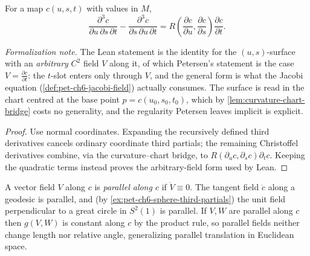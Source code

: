 \begin{lemma}
  \label{lem:pet-ch6-third-partial-commutator}
  \leanok
  For a map $c(u,s,t)$ with values in $M$,
  \[
    \frac{\partial^3c}{\partial u\,\partial s\,\partial t}
    -\frac{\partial^3c}{\partial s\,\partial u\,\partial t}
    =R\!\left(\frac{\partial c}{\partial u},\frac{\partial c}{\partial s}\right)
    \frac{\partial c}{\partial t}.
  \]

  \emph{Formalization note.} The Lean statement is the identity for the
  $(u,s)$-surface with an \emph{arbitrary} $C^2$ field $V$ along it, of which
  Petersen's statement is the case $V=\frac{\partial c}{\partial t}$: the $t$-slot
  enters only through $V$, and the general form is what the Jacobi equation
  (\cref{def:pet-ch6-jacobi-field}) actually consumes. The surface is read in the
  chart centred at the base point $p=c(u_0,s_0,t_0)$, which by
  \cref{lem:curvature-chart-bridge} costs no generality, and the regularity Petersen
  leaves implicit is explicit.
\end{lemma}
\begin{proof}
  \leanok
  \sketch
  Use normal coordinates. Expanding the recursively defined third derivatives cancels ordinary coordinate third partials; the remaining Christoffel derivatives combine, via the curvature--chart bridge, to \(R(\partial_u c,\partial_s c)\partial_t c\). Keeping the quadratic terms instead proves the arbitrary-field form used by Lean.
\end{proof}

\begin{definition}
  \label{def:pet-ch6-parallel-field}
  \leanok
  A vector field $V$ along $c$ is \emph{parallel along $c$} if $\dot V\equiv0$.
  The tangent field $\dot c$ along a geodesic is parallel, and (by
  \cref{ex:pet-ch6-sphere-third-partials}) the unit field perpendicular to a
  great circle in $S^2(1)$ is parallel. If $V,W$ are parallel along $c$ then
  $g(V,W)$ is constant along $c$ by the product rule, so parallel fields neither
  change length nor relative angle, generalizing parallel translation in
  Euclidean space.
\end{definition}

